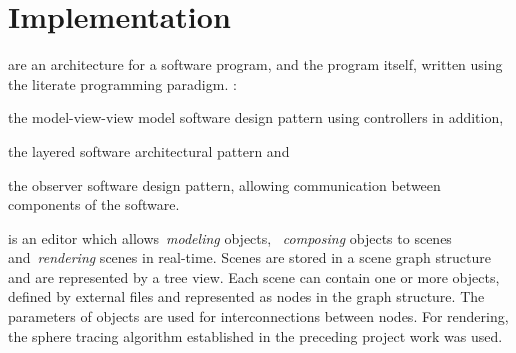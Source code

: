 
\section{Implementation}

 are an architecture for a software
program, and the program itself, written using the literate programming
paradigm.
:
\begin{enumerate*}
  \item the model-view-view model software design pattern using controllers in
    addition,
  \item the layered software architectural pattern and
  \item the observer software design pattern, allowing communication between
    components of the software.
\end{enumerate*}
 is an editor which allows~\emph{modeling}
objects, ~\emph{composing} objects to scenes and~\emph{rendering} scenes in
real-time. Scenes are stored in a scene graph structure and are represented by a
tree view. Each scene can contain one or more objects, defined by external
files and represented as nodes in the graph structure. The parameters of
objects are used for interconnections between nodes. For rendering, the sphere
tracing algorithm established in the preceding project work was used.




